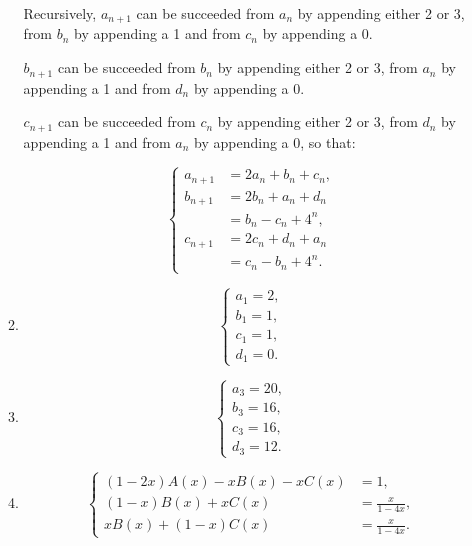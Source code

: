 \documentclass{../../cls/sig-alternate-05-2015}
\begin{document}
\begin{enumerate}
\begin{enumerate}
		Recursively, $a_{n + 1}$ can be succeeded from $a_n$ by appending either 2 or 3, from $b_n$ by appending a 1 and from $c_n$ by appending a 0.
		
		$b_{n + 1}$ can be succeeded from $b_n$ by appending either 2 or 3, from $a_n$ by appending a 1 and from $d_n$ by appending a 0.
		
		$c_{n + 1}$ can be succeeded from $c_n$ by appending either 2 or 3, from $d_n$ by appending a 1 and from $a_n$ by appending a 0, so that:
		
		\begin{equation}
			\begin{cases}
			a_{n+1} & = 2a_n + b_n + c_n,\\
			b_{n+1} & = 2b_n + a_n + d_n\\
			& = b_n - c_n + 4^n,\\
			c_{n+1} & = 2c_n + d_n + a_n\\
			& = c_n - b_n + 4^n.
			\end{cases}
		\end{equation}
		
		\item \begin{equation}
			\begin{cases}
			a_1 = 2,\\
			b_1 = 1,\\
			c_1 = 1,\\
			d_1 = 0.
			\end{cases}
		\end{equation}
		
		\item \begin{equation}
			\begin{cases}
			a_3 = 20,\\
			b_3 = 16,\\
			c_3 = 16,\\
			d_3 = 12.
			\end{cases}
		\end{equation}
		
		\item \begin{equation}
			\begin{cases}
			(1 - 2x)A(x) - x B(x) - x C(x) & = 1,\\
			(1 - x) B(x) + x C(x) & = \frac{x}{1 - 4x},\\
			x B(x) + (1 - x) C(x) & = \frac{x}{1 - 4x}.
			\end{cases}
		\end{equation}
		

\end{enumerate}
\end{enumerate}
\end{document}
